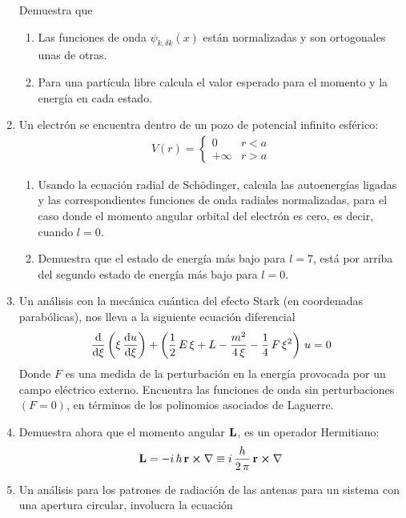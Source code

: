 \begin{enumerate}
Demuestra que
\begin{enumerate}
\item Las funciones de onda $\psi_{k, \delta k} (x)$ están normalizadas y son ortogonales unas de otras.
\item Para una partícula libre calcula el valor esperado para el momento y la energía en cada estado. 
\end{enumerate}
\item Un electrón se encuentra dentro de un pozo de potencial infinito esférico:
\begin{align*}
V(r) = \begin{cases}
0 & r < a \\
+\infty & r > a
\end{cases}
\end{align*}
\begin{enumerate}
\item Usando la ecuación radial de Schödinger, calcula las autoenergías ligadas y las correspondientes funciones de onda radiales normalizadas, para el caso donde el momento angular orbital del electrón es cero, es decir, cuando $l = 0$.
\item Demuestra que el estado de energía más bajo para $l = 7$, está por arriba del segundo estado de energía más bajo para $l = 0$.
\end{enumerate}
\item Un análisis con la mecánica cuántica del efecto Stark (en coordenadas parabólicas), nos lleva a la siguiente ecuación diferencial
\begin{align*}
\dv{\xi} \left( \xi \, \dv{u}{\xi}  \right) + \left( \dfrac{1}{2} \, E \, \xi + L - \dfrac{m^{2}}{4 \, \xi} - \dfrac{1}{4} \, F \, \xi^{2} \right) \, u = 0
\end{align*}
Donde $F$ es una medida de la perturbación en la energía provocada por un campo eléctrico externo. Encuentra las funciones de onda sin perturbaciones $(F=0)$, en términos de los polinomios asociados de Laguerre.
\item Demuestra ahora que el momento angular $\vb{L}$, es un operador Hermitiano:
\begin{align*}
\vb{L} = - i\, \hbar \, \vb{r} \cp \nabla \equiv i \, \dfrac{h}{2 \, \pi} \, \vb{r} \cp \nabla
\end{align*}
\item Un análisis para los patrones de radiación de las antenas para un sistema con una apertura circular, involucra la ecuación

\end{enumerate}
